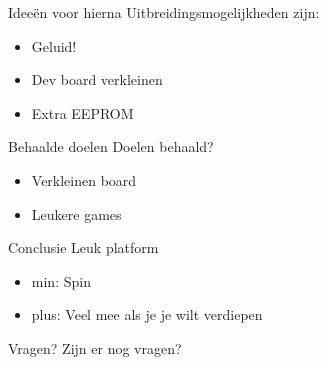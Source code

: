 \documentclass{beamer}
\begin{document}
\begin {frame}{Ideeën voor hierna}
	Uitbreidingsmogelijkheden zijn:
	\begin{itemize}
		\item
			Geluid!
			\pause
		\item
			Dev board verkleinen
			\pause
		\item
			Extra EEPROM
	\end{itemize}
\end{frame}

\begin{frame}{Behaalde doelen}
	Doelen behaald?
	\begin{itemize}
		\item
			Verkleinen board
			\pause
		\item
			Leukere games
	\end{itemize}
\end{frame}

\begin{frame}{Conclusie}
	Leuk platform
	\begin{itemize}
		\item
			min: Spin
			\pause
		\item
			plus: Veel mee als je je wilt verdiepen
	\end{itemize}
\end{frame}

\begin{frame}{Vragen?}
	Zijn er nog vragen?
\end{frame}
\end{document}
